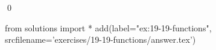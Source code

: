 
\begin{ex}
  \label{ex:19-19-functions}
  
  \qed
\end{ex}
\begin{python0}
from solutions import *
add(label="ex:19-19-functions",
    srcfilename='exercises/19-19-functions/answer.tex')
\end{python0}
